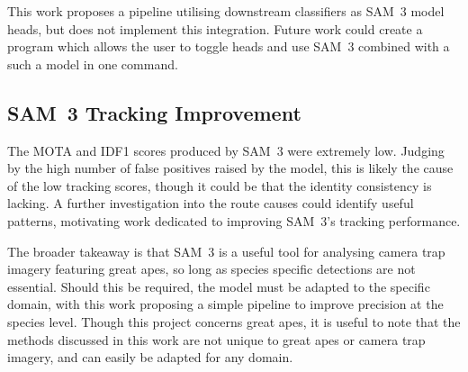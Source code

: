 \documentclass[author={Jacob Stephenson},
    degree={BSc},
    title={Robust Great Ape Species Detection in Wild Camera Trap Imagery with Promptable Concept Segmentation},
    unit={COMS30045},
    subtitle={}]{dissertation}
\begin{document}
This work proposes a pipeline utilising downstream classifiers as SAM~3 model heads, but does not implement this integration. Future work could create a program which allows the user to toggle heads and use SAM~3 combined with a such a model in one command.

\subsection{SAM~3 Tracking Improvement}

The MOTA and IDF1 scores produced by SAM~3 were extremely low. Judging by the high number of false positives raised by the model, this is likely the cause of the low tracking scores, though it could be that the identity consistency is lacking. A further investigation into the route causes could identify useful patterns, motivating work dedicated to improving SAM~3's tracking performance.

\bigskip
\noindent
The broader takeaway is that SAM~3 is a useful tool for analysing camera trap imagery featuring great apes, so long as species specific detections are not essential. Should this be required, the model must be adapted to the specific domain, with this work proposing a simple pipeline to improve precision at the species level. Though this project concerns great apes, it is useful to note that the methods discussed in this work are not unique to great apes or camera trap imagery, and can easily be adapted for any domain.




%
%
%
\end{document}
